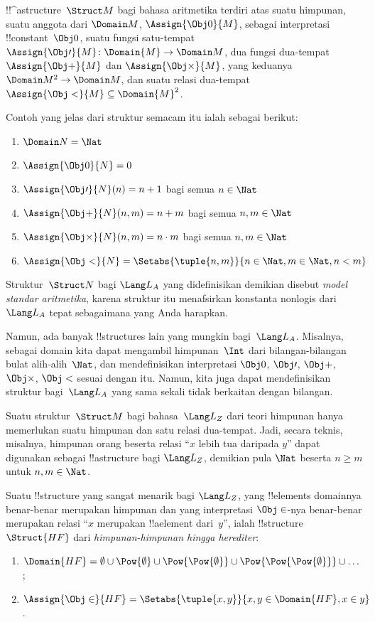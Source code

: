 \documentclass[../../../include/open-logic-section]{subfiles}
\begin{document}
\begin{ex}
!!^a{structure}~$\Struct M$ bagi bahasa aritmetika terdiri atas suatu
  himpunan, suatu anggota dari $\Domain M$, $\Assign{\Obj 0}{M}$, sebagai
  interpretasi !!{constant}~$\Obj 0$, suatu fungsi satu-tempat
  $\Assign{\Obj \prime}{M} \colon \Domain{M} \to \Domain M$, dua fungsi
  dua-tempat $\Assign{\Obj +}{M}$ dan $\Assign{\Obj \times}{M}$, yang
  keduanya $\Domain M^2 \to \Domain M$, dan suatu relasi dua-tempat
  $\Assign{\Obj <}{M} \subseteq \Domain{M}^2$.

Contoh yang jelas dari struktur semacam itu ialah sebagai berikut:
\begin{enumerate}
\item $\Domain N = \Nat$
\item $\Assign{\Obj 0}{N} = 0$
\item $\Assign{\Obj \prime}{N}(n) = n + 1$ bagi semua $n \in \Nat$
\item $\Assign{\Obj +}{N}(n, m) = n + m$ bagi semua $n, m \in \Nat$
\item $\Assign{\Obj \times}{N}(n, m) = n\cdot m$ bagi semua $n, m \in \Nat$
\item $\Assign{\Obj <}{N} = \Setabs{\tuple{n, m}}{n \in \Nat, m \in
  \Nat, n < m}$
\end{enumerate}
Struktur~$\Struct N$ bagi $\Lang L_A$ yang didefinisikan demikian disebut
\emph{model standar aritmetika}, karena struktur itu menafsirkan konstanta
nonlogis dari~$\Lang L_A$ tepat sebagaimana yang Anda harapkan.

Namun, ada banyak !!{structure}s lain yang mungkin bagi~$\Lang L_A$.
Misalnya, sebagai domain kita dapat mengambil himpunan~$\Int$ dari
bilangan-bilangan bulat alih-alih~$\Nat$, dan mendefinisikan interpretasi
$\Obj 0$, $\Obj \prime$, $\Obj +$, $\Obj \times$, $\Obj <$ sesuai dengan
itu. Namun, kita juga dapat mendefinisikan struktur bagi~$\Lang L_A$ yang
sama sekali tidak berkaitan dengan bilangan.
\end{ex}

\begin{ex}
Suatu struktur~$\Struct M$ bagi bahasa~$\Lang L_Z$ dari teori himpunan hanya
memerlukan suatu himpunan dan satu relasi dua-tempat. Jadi, secara teknis,
misalnya, himpunan orang beserta relasi ``$x$ lebih tua daripada $y$'' dapat
digunakan sebagai !!a{structure} bagi $\Lang L_Z$, demikian pula $\Nat$
beserta $n \ge m$ untuk $n, m \in \Nat$.

Suatu !!{structure} yang sangat menarik bagi $\Lang L_Z$, yang
!!{element}s domainnya benar-benar merupakan himpunan dan yang interpretasi
$\Obj \in$-nya benar-benar merupakan relasi ``$x$ merupakan !!a{element}
dari~$y$'', ialah !!{structure}~$\Struct{{HF}}$ dari
\emph{himpunan-himpunan hingga herediter}:
\begin{enumerate}
\item $\Domain{{{HF}}} = \emptyset \cup \Pow{\emptyset} \cup
  \Pow{\Pow{\emptyset}} \cup \Pow{\Pow{\Pow{\emptyset}}} \cup \dots$;
\item $\Assign{\Obj \in}{{{HF}}} = \Setabs{\tuple{x, y}}{x, y \in
  \Domain{{{HF}}}, x \in y}$.
\end{enumerate}
\end{ex}
\end{document}
